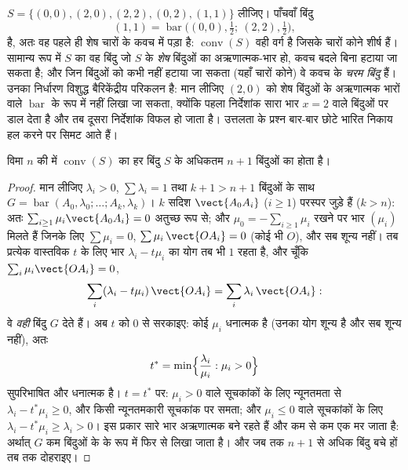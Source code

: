 \begin{example}\label{ex:b2:affine:squarehull}
$S = \{(0,0), (2,0), (2,2), (0,2), (1,1)\}$ लीजिए। पाँचवाँ बिंदु 
\[
(1,1) = \operatorname{bar}\bigl((0,0), \tfrac12;\ (2,2),
\tfrac12\bigr),
\]
है, अतः वह पहले ही शेष चारों के कवच में पड़ा है: $\operatorname{conv}(S)$ वही वर्ग है जिसके
चारों कोने शीर्ष हैं। सामान्य रूप में $S$ का वह बिंदु जो $S$ के
\emph{शेष} बिंदुओं का अऋणात्मक-भार  हो, कवच बदले बिना हटाया जा
सकता है; और जिन बिंदुओं को कभी नहीं हटाया जा सकता (यहाँ चारों कोने) वे कवच
के \emph{चरम बिंदु} हैं। उनका निर्धारण विशुद्ध बैरिकेंद्रीय परिकलन है: मान
लीजिए $(2,0)$ को शेष बिंदुओं के अऋणात्मक भारों वाले $\operatorname{bar}$ के रूप में नहीं लिखा
जा सकता, क्योंकि पहला निर्देशांक सारा भार $x = 2$ वाले बिंदुओं पर डाल देता है
और तब दूसरा निर्देशांक विफल हो जाता है। उत्तलता के प्रश्न बार-बार छोटे
भारित निकाय हल करने पर सिमट आते हैं।
\end{example}

\begin{theorem}[कारेथेओदोरी]\label{thm:b2:affine:caratheodory}
विमा $n$ की  में $\operatorname{conv}(S)$ का हर बिंदु $S$ के अधिकतम $n + 1$ बिंदुओं का
 होता है।
\end{theorem}

\begin{proof}
मान लीजिए $\lambda_i > 0$, $\sum\lambda_i = 1$ तथा $k + 1 > n + 1$ बिंदुओं के साथ $G = \operatorname{bar}(A_0, \lambda_0; \dots; A_k, \lambda_k)$। $k$ सदिश $\vect{A_0A_i}$ ($i \geq 1$) परस्पर
जुड़े हैं ($k > n$): अतः $\sum_{i\geq1}\mu_i \vect{A_0A_i} = 0$ अतुच्छ रूप से; और $\mu_0 = -\sum_{i\geq1}\mu_i$ रखने पर भार $(\mu_i)$ मिलते हैं
जिनके लिए $\sum\mu_i = 0$, $\sum \mu_i\,\vect{OA_i} = 0$ (कोई भी $O$), और सब शून्य नहीं। तब प्रत्येक वास्तविक
$t$ के लिए भार $\lambda_i - t\mu_i$ का योग तब भी $1$ रहता है, और चूँकि $\sum_i\mu_i\vect{OA_i} = 0$,
\[
\sum_i(\lambda_i - t\mu_i)\,\vect{OA_i}
= \sum_i\lambda_i\,\vect{OA_i} :
\]
वे \emph{वही} बिंदु $G$ देते हैं। अब $t$ को $0$ से सरकाइए: कोई $\mu_i$
धनात्मक है (उनका योग शून्य है और सब शून्य नहीं), अतः
\[
t^* = \min\Bigl\{\frac{\lambda_i}{\mu_i} : \mu_i > 0\Bigr\}
\]
सुपरिभाषित और धनात्मक है। $t = t^*$ पर: $\mu_i > 0$ वाले सूचकांकों के लिए न्यूनतमता से
$\lambda_i - t^*\mu_i \geq 0$, और किसी न्यूनतमकारी सूचकांक पर समता; और $\mu_i
\leq 0$ वाले सूचकांकों के लिए
$\lambda_i - t^*\mu_i \geq \lambda_i > 0$। इस प्रकार सारे भार अऋणात्मक बने रहते हैं और कम से कम एक मर जाता है:
अर्थात् $G$ कम बिंदुओं के  के रूप में फिर से लिखा जाता है। और
जब तक $n + 1$ से अधिक बिंदु बचे हों तब तक दोहराइए।
\end{proof}

